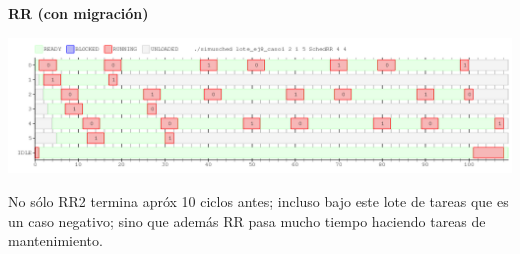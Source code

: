 \textbf{RR (con migración)}
\begin{center}
 \includegraphics[scale=0.48]{./RR2/caso2RR.png}
\end{center}

No sólo RR2 termina apróx 10 ciclos antes; incluso bajo este lote de tareas que 
es un caso negativo; sino que además RR pasa mucho tiempo haciendo 
tareas de mantenimiento.